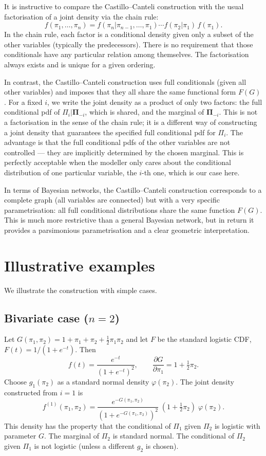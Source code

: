 It is instructive to compare the Castillo–Canteli construction with the usual factorisation of a joint density via the chain rule:
\[
f(\pi_1,\ldots,\pi_n) = f(\pi_n|\pi_{n-1},\ldots,\pi_1) \cdots f(\pi_2|\pi_1)\,f(\pi_1).
\]
In the chain rule, each factor is a conditional density given only a subset of the other variables (typically the predecessors). There is no requirement that those conditionals have any particular relation among themselves. The factorisation always exists and is unique for a given ordering.

In contrast, the Castillo–Canteli construction uses full conditionals (given all other variables) and imposes that they all share the same functional form \(F(G)\). For a fixed \(i\), we write the joint density as a product of only two factors: the full conditional pdf of \(\Pi_i|\boldsymbol{\Pi}_{-i}\), which is shared, and the marginal of \(\boldsymbol{\Pi}_{-i}\). This is not a factorisation in the sense of the chain rule; it is a different way of constructing a joint density that guarantees the specified full conditional pdf for \(\Pi_i\). The advantage is that the full conditional pdfs of the other variables are not controlled — they are implicitly determined by the chosen marginal. This is perfectly acceptable when the modeller only cares about the conditional distribution of one particular variable, the \(i\)-th one, which is our case here.

In terms of Bayesian networks, the Castillo–Canteli construction corresponds to a complete graph (all variables are connected) but with a very specific parametrisation: all full conditional distributions share the same function \(F(G)\). This is much more restrictive than a general Bayesian network, but in return it provides a parsimonious parametrisation and a clear geometric interpretation.

\section{Illustrative examples}
\label{sec:cc-examples}

We illustrate the construction with simple cases.

\subsection{Bivariate case (\(n=2\))}

Let \(G(\pi_1,\pi_2) = 1 + \pi_1 + \pi_2 + \frac12\pi_1\pi_2\) and let \(F\) be the standard logistic CDF, \(F(t)=1/(1+e^{-t})\). Then
\[
f(t) = \frac{e^{-t}}{(1+e^{-t})^2},\qquad \frac{\partial G}{\partial\pi_1}=1+\tfrac12\pi_2.
\]
Choose \(g_1(\pi_2)\) as a standard normal density \(\varphi(\pi_2)\). The joint density constructed from \(i=1\) is
\[
f^{(1)}(\pi_1,\pi_2) = \frac{e^{-G(\pi_1,\pi_2)}}{(1+e^{-G(\pi_1,\pi_2)})^2}\; (1+\tfrac12\pi_2)\; \varphi(\pi_2).
\]
This density has the property that the conditional of \(\Pi_1\) given \(\Pi_2\) is logistic with parameter \(G\). The marginal of \(\Pi_2\) is standard normal. The conditional of \(\Pi_2\) given \(\Pi_1\) is not logistic (unless a different \(g_2\) is chosen).

